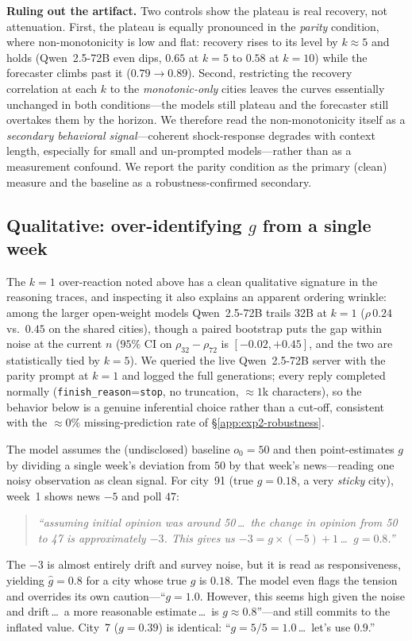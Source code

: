 \textbf{Ruling out the artifact.}  Two controls show the plateau is real recovery, not attenuation.
First, the plateau is equally pronounced in the \emph{parity} condition, where non-monotonicity is
low and flat: recovery rises to its level by $k\approx5$ and holds (Qwen~2.5-72B even dips, $0.65$ at
$k=5$ to $0.58$ at $k=10$) while the forecaster climbs past it ($0.79\!\to\!0.89$).  Second,
restricting the recovery correlation at each $k$ to the \emph{monotonic-only} cities leaves the
curves essentially unchanged in both conditions---the models still plateau and the forecaster still
overtakes them by the horizon.  We therefore read the non-monotonicity itself as a
\emph{secondary behavioral signal}---coherent shock-response degrades with context length,
especially for small and un-prompted models---rather than as a measurement confound.  We report the
parity condition as the primary (clean) measure and the baseline as a robustness-confirmed
secondary.

\subsection{Qualitative: over-identifying \texorpdfstring{$g$}{g} from a single week}
\label{app:exp2-traces}

The $k{=}1$ over-reaction noted above has a clean qualitative signature in the reasoning traces, and
inspecting it also explains an apparent ordering wrinkle: among the larger open-weight models
Qwen~2.5-72B trails 32B at $k{=}1$ ($\rho\,0.24$ vs.\ $0.45$ on the shared cities), though a paired
bootstrap puts the gap within noise at the current $n$ ($95\%$ CI on $\rho_{32}-\rho_{72}$ is
$[-0.02,+0.45]$, and the two are statistically tied by $k{=}5$). We queried the live Qwen~2.5-72B
server with the parity prompt at $k{=}1$ and logged the full generations; every reply completed
normally (\texttt{finish\_reason}{=}\texttt{stop}, no truncation, $\approx1$k characters), so the
behavior below is a genuine inferential choice rather than a cut-off, consistent with the
$\approx0\%$ missing-prediction rate of \S\ref{app:exp2-robustness}.

The model assumes the (undisclosed) baseline $o_0{=}50$ and then point-estimates $g$ by dividing a
single week's deviation from $50$ by that week's news---reading one noisy observation as clean
signal. For city~91 (true $g{=}0.18$, a very \emph{sticky} city), week~1 shows news $-5$ and poll
$47$:
\begin{quote}\small\itshape
``assuming initial opinion was around 50\,\ldots\ the change in opinion from 50 to 47 is approximately
$-3$. This gives us $-3 = g\times(-5)+1$\,\ldots\ $g = 0.8$.''
\end{quote}
The $-3$ is almost entirely drift and survey noise, but it is read as responsiveness, yielding
$\hat g{=}0.8$ for a city whose true $g$ is $0.18$. The model even flags the tension and overrides
its own caution---``$g = 1.0$. However, this seems high given the noise and drift\,\ldots\ a more
reasonable estimate\,\ldots\ is $g \approx 0.8$''---and still commits to the inflated value. City~7
($g{=}0.39$) is identical: ``$g = 5/5 = 1.0$\,\ldots\ let's use $0.9$.''

